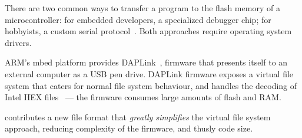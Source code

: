 There are two common ways to transfer a program to the flash memory of a microcontroller: for embedded developers, a specialized debugger chip; for hobbyists, a custom serial protocol~\cite{AVRDUDEA15:online}. Both approaches require operating system drivers.

ARM's mbed platform provides DAPLink~\cite{GitHubAR5:online}, firmware that presents itself to an external computer as a USB pen drive. DAPLink firmware exposes a virtual file system that caters for normal file system behaviour, and handles the decoding of Intel HEX files~\cite{IntelHEX} --- the firmware consumes large amounts of flash and RAM.

\UF contributes a new file format that \emph{greatly simplifies} the virtual file system approach, reducing complexity of the firmware, and thusly code size.











